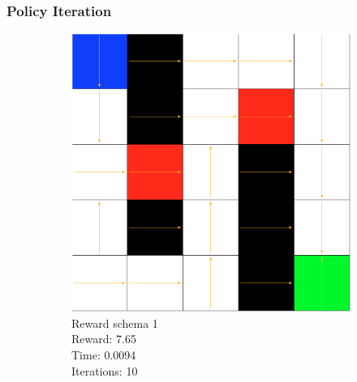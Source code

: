\documentclass[a4paper,10pt]{article}
\begin{document}
\subsubsection{Policy Iteration}
\begin{figure}[H]
        \centering
        \begin{subfigure}[b]{0.3\textwidth}
                \includegraphics[width=\textwidth]{figures/5x5_piter_r1.png}
                \caption{Reward schema 1\\
                Reward:  7.65 \\
                Time:  0.0094\\
                Iterations: 10 }
                \label{fig:p1}
        \end{subfigure}%
        ~ %
        \begin{subfigure}[b]{0.3\textwidth}

\end{subfigure}
\end{figure}
\end{document}
